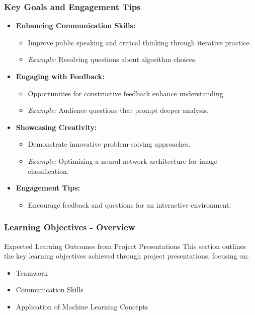 \documentclass{beamer}
\begin{document}
\begin{frame}[fragile]
    \frametitle{Key Goals and Engagement Tips}
    \begin{itemize}
        \item \textbf{Enhancing Communication Skills:}
            \begin{itemize}
                \item Improve public speaking and critical thinking through iterative practice.
                \item \textit{Example:} Resolving questions about algorithm choices.
            \end{itemize}
        
        \item \textbf{Engaging with Feedback:}
            \begin{itemize}
                \item Opportunities for constructive feedback enhance understanding.
                \item \textit{Example:} Audience questions that prompt deeper analysis.
            \end{itemize}

        \item \textbf{Showcasing Creativity:}
            \begin{itemize}
                \item Demonstrate innovative problem-solving approaches.
                \item \textit{Example:} Optimizing a neural network architecture for image classification.
            \end{itemize}
        
        \item \textbf{Engagement Tips:}
            \begin{itemize}
                \item Encourage feedback and questions for an interactive environment.
            \end{itemize}
    \end{itemize}
\end{frame}

\begin{frame}[fragile]
    \frametitle{Learning Objectives - Overview}
    \begin{block}{Expected Learning Outcomes from Project Presentations}
        This section outlines the key learning objectives achieved through project presentations, focusing on:
        \begin{itemize}
            \item Teamwork
            \item Communication Skills
            \item Application of Machine Learning Concepts
        \end{itemize}
    \end{block}
\end{frame}
\end{document}
